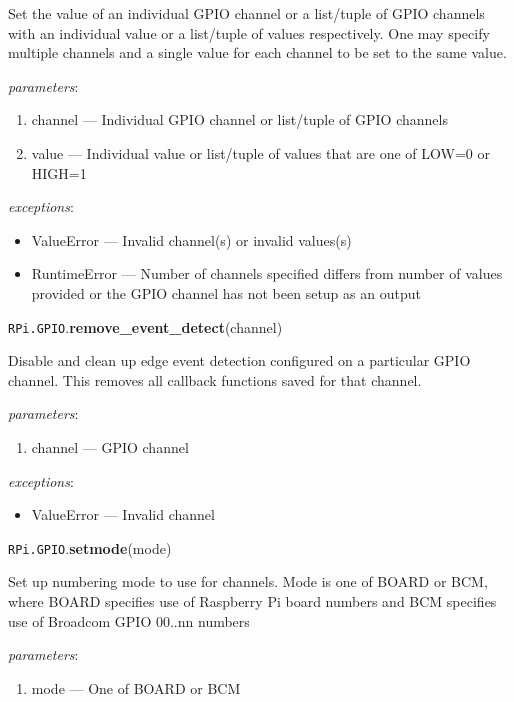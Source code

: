 \documentclass[12pt]{article}
\begin{document}
Set the value of an individual GPIO channel or a list/tuple of GPIO channels with an individual value or a list/tuple of values respectively.
One may specify multiple channels and a single value for each channel to be set to the same value.
        
\textit{parameters}:
\begin{enumerate}      
        \item channel --- Individual GPIO channel or list/tuple of GPIO channels
        \item value --- Individual value or list/tuple of values that are one of LOW=0 or HIGH=1
\end{enumerate}
 
 
\textit{exceptions}:
\begin{itemize}
    \item ValueError --- Invalid channel(s) or invalid values(s)
    \item RuntimeError --- Number of channels specified differs from number of values provided or the GPIO channel has not been setup as an output
\end{itemize}



\noindent \texttt{RPi.GPIO}.\textbf{remove\_event\_detect}(channel)
        
Disable and clean up edge event detection configured on a particular GPIO channel. This removes all callback functions saved for that channel.
        
\textit{parameters}:
\begin{enumerate}      
        \item channel --- GPIO channel
\end{enumerate}


\textit{exceptions}:
\begin{itemize}
    \item ValueError --- Invalid channel
\end{itemize}


\noindent \texttt{RPi.GPIO}.\textbf{setmode}(mode)

Set up numbering mode to use for channels. Mode is one of BOARD or BCM, where BOARD specifies use of Raspberry Pi board numbers and BCM specifies use of Broadcom GPIO 00..nn numbers
        
\textit{parameters}:
\begin{enumerate}      
        \item mode --- One of BOARD or BCM
\end{enumerate}
 
\end{document}
